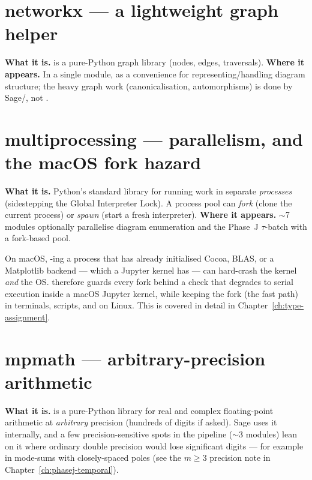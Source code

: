\section{networkx --- a lightweight graph helper}
\textbf{What it is.}   is a pure-Python graph library (nodes,
edges, traversals).  \textbf{Where it appears.}  In a single module, as a
convenience for representing/handling diagram structure; the heavy graph work
(canonicalisation, automorphisms) is done by Sage/, not
.

\section{multiprocessing --- parallelism, and the macOS fork hazard}
\textbf{What it is.}  Python's standard library for running work in separate
\emph{processes} (sidestepping the Global Interpreter Lock).  A process pool can
\emph{fork} (clone the current process) or \emph{spawn} (start a fresh
interpreter).  \textbf{Where it appears.}  $\sim$7 modules optionally parallelise
diagram enumeration and the Phase~J $\tau$-batch with a fork-based pool.

\begin{gotcha}
On macOS, -ing a process that has already initialised Cocoa, BLAS, or
a Matplotlib backend --- which a Jupyter kernel has --- can hard-crash the kernel
\emph{and} the OS.  \Daedalus{} therefore guards every fork behind a
 check that degrades to serial execution inside a macOS Jupyter
kernel, while keeping the fork (the fast path) in terminals, scripts, and on
Linux.  This is covered in detail in Chapter~\ref{ch:type-assignment}.
\end{gotcha}

\section{mpmath --- arbitrary-precision arithmetic}
\textbf{What it is.}   is a pure-Python library for real and complex
floating-point arithmetic at \emph{arbitrary} precision (hundreds of digits if
asked).  Sage uses it internally, and a few precision-sensitive spots in the
pipeline ($\sim$3 modules) lean on it where ordinary double precision would lose
significant digits --- for example in mode-sums with closely-spaced poles
(see the $m\!\ge\!3$ precision note in Chapter~\ref{ch:phasej-temporal}).

